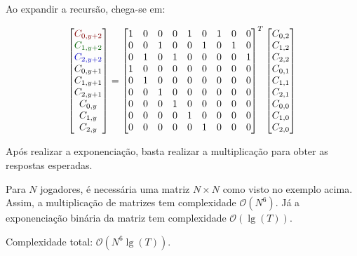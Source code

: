 Ao expandir a recursão, chega-se em:

\[
\begin{bmatrix}
    \red{C_{0,y+2}} \\ \green{C_{1,y+2}} \\ \blue{C_{2,y+2}} \\ C_{0,y+1} \\ C_{1,y+1} \\ C_{2,y+1} \\ C_{0,y} \\ C_{1,y} \\ C_{2,y}
\end{bmatrix}
=
\begin{bmatrix}
    1&0&0&0&1&0&1&0&0 \\
    0&0&1&0&0&1&0&1&0 \\
    0&1&0&1&0&0&0&0&1 \\
    1&0&0&0&0&0&0&0&0 \\
    0&1&0&0&0&0&0&0&0 \\
    0&0&1&0&0&0&0&0&0 \\
    0&0&0&1&0&0&0&0&0 \\
    0&0&0&0&1&0&0&0&0 \\
    0&0&0&0&0&1&0&0&0
\end{bmatrix}^{T}
\begin{bmatrix}
    C_{0,2} \\ C_{1,2} \\ C_{2,2} \\ C_{0,1} \\ C_{1,1} \\ C_{2,1} \\ C_{0,0} \\ C_{1,0} \\ C_{2,0}
\end{bmatrix}
\]

Após realizar a exponenciação, basta realizar a multiplicação para obter as respostas esperadas.

Para $N$ jogadores, é necessária uma matriz $N \times N$ como visto no exemplo acima. Assim, a multiplicação de matrizes tem complexidade $\mathcal{O}(N^6)$. Já a exponenciação binária da matriz tem complexidade $\mathcal{O}(\lg(T))$. 

Complexidade total: $\mathcal{O}(N^6 \lg(T))$.
